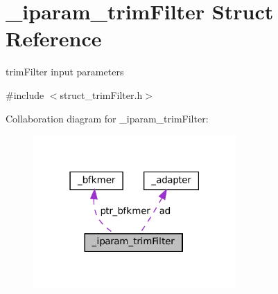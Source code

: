 \hypertarget{struct__iparam__trimFilter}{}\section{\+\_\+iparam\+\_\+trim\+Filter Struct Reference}
\label{struct__iparam__trimFilter}


trim\+Filter input parameters  




{\ttfamily \#include $<$struct\+\_\+trim\+Filter.\+h$>$}



Collaboration diagram for \+\_\+iparam\+\_\+trim\+Filter\+:
\nopagebreak
\begin{figure}[H]
\begin{center}
\leavevmode
\includegraphics[width=219pt]{struct__iparam__trimFilter__coll__graph}
\end{center}
\end{figure}
